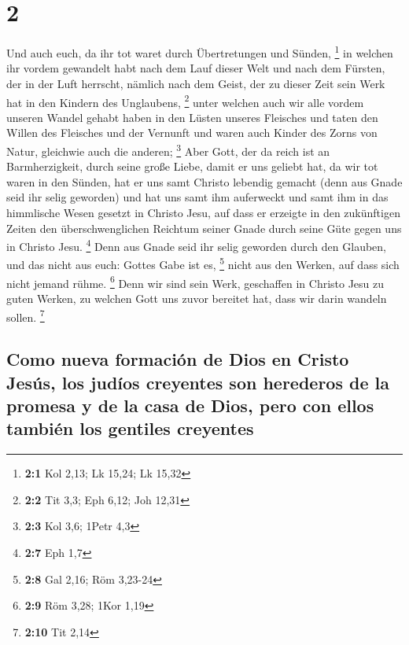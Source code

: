 \hypertarget{section-1}{%
\section{2}\label{section-1}}

 Und auch euch, da ihr tot waret durch Übertretungen und
Sünden, \footnote{\textbf{2:1} Kol 2,13; Lk 15,24; Lk 15,32}
 in welchen ihr vordem gewandelt habt nach dem Lauf dieser
Welt und nach dem Fürsten, der in der Luft herrscht, nämlich nach dem
Geist, der zu dieser Zeit sein Werk hat in den Kindern des Unglaubens,
\footnote{\textbf{2:2} Tit 3,3; Eph 6,12; Joh 12,31} 
unter welchen auch wir alle vordem unseren Wandel gehabt haben in den
Lüsten unseres Fleisches und taten den Willen des Fleisches und der
Vernunft und waren auch Kinder des Zorns von Natur, gleichwie auch die
anderen; \footnote{\textbf{2:3} Kol 3,6; 1Petr 4,3}  Aber
Gott, der da reich ist an Barmherzigkeit, durch seine große Liebe, damit
er uns geliebt hat,  da wir tot waren in den Sünden, hat
er uns samt Christo lebendig gemacht (denn aus Gnade seid ihr selig
geworden)  und hat uns samt ihm auferweckt und samt ihm in
das himmlische Wesen gesetzt in Christo Jesu,  auf dass er
erzeigte in den zukünftigen Zeiten den überschwenglichen Reichtum seiner
Gnade durch seine Güte gegen uns in Christo Jesu. \footnote{\textbf{2:7}
  Eph 1,7}  Denn aus Gnade seid ihr selig geworden durch
den Glauben, und das nicht aus euch: Gottes Gabe ist es, \footnote{\textbf{2:8}
  Gal 2,16; Röm 3,23-24}  nicht aus den Werken, auf dass
sich nicht jemand rühme. \footnote{\textbf{2:9} Röm 3,28; 1Kor 1,19}
 Denn wir sind sein Werk, geschaffen in Christo Jesu zu
guten Werken, zu welchen Gott uns zuvor bereitet hat, dass wir darin
wandeln sollen. \footnote{\textbf{2:10} Tit 2,14}

\hypertarget{como-nueva-formaciuxf3n-de-dios-en-cristo-jesuxfas-los-juduxedos-creyentes-son-herederos-de-la-promesa-y-de-la-casa-de-dios-pero-con-ellos-tambiuxe9n-los-gentiles-creyentes}{%
\subsection{Como nueva formación de Dios en Cristo Jesús, los judíos
creyentes son herederos de la promesa y de la casa de Dios, pero con
ellos también los gentiles
creyentes}\label{como-nueva-formaciuxf3n-de-dios-en-cristo-jesuxfas-los-juduxedos-creyentes-son-herederos-de-la-promesa-y-de-la-casa-de-dios-pero-con-ellos-tambiuxe9n-los-gentiles-creyentes}}

